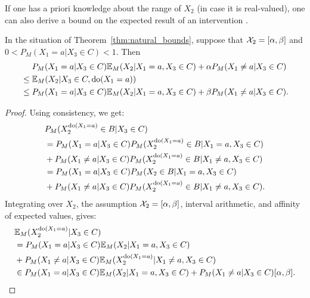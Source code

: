 If one has a priori knowledge about the range of $X_2$ (in case it is real-valued), one can also derive a bound on the expected result of an intervention \cite{ManskiPepper2013}.
\begin{Cor}\label{cor:natural_bounds}
  In the situation of Theorem~\ref{thm:natural_bounds}, suppose that $\mathcal{X}_2 = [\alpha,\beta]$ and $0 < P_M(X_1=a|X_3\in C) < 1$. Then
  \begin{equation}\label{eq:natural_bounds_CATE}\begin{split}
    & P_M(X_1=a|X_3\in C) \mathbb{E}_M(X_2|X_1=a,X_3\in C) + \alpha P_M(X_1\ne a|X_3\in C) \\
    {}\le {}& \mathbb{E}_M(X_2|X_3\in C,\operatorname{do}(X_1=a)) \\
    {}\le {}& P_M(X_1=a|X_3\in C) \mathbb{E}_M(X_2|X_1=a,X_3\in C) + \beta P_M(X_1\ne a|X_3\in C).
  \end{split}\end{equation}
\end{Cor}
\begin{proof}
Using consistency, we get:
\begin{equation*}\begin{split}
  &P_M(X_2^{\operatorname{do}(X_1=a)} \in B|X_3\in C) \\
  &= P_M(X_1=a|X_3\in C)  P_M(X_2^{\operatorname{do}(X_1=a)} \in B|X_1=a,X_3\in C)  \\
  & + P_M(X_1 \ne a|X_3\in C) P_M(X_2^{\operatorname{do}(X_1=a)} \in B|X_1\ne a,X_3\in C) \\
  &= P_M(X_1=a|X_3\in C)  P_M(X_2 \in B|X_1=a,X_3\in C)  \\
  & + P_M(X_1 \ne a|X_3\in C) P_M(X_2^{\operatorname{do}(X_1=a)} \in B|X_1\ne a,X_3\in C).
\end{split}\end{equation*}
Integrating over $X_2$, the assumption $\mathcal{X}_2 = [\alpha,\beta]$, interval arithmetic, and affinity of expected values, gives:
\begin{equation*}\begin{split}
  &\mathbb{E}_M(X_2^{\operatorname{do}(X_1=a)}|X_3\in C) \\
  &= P_M(X_1=a|X_3\in C) \mathbb{E}_M(X_2|X_1=a,X_3\in C)  \\
  &+ P_M(X_1 \ne a|X_3\in C) \mathbb{E}_M(X_2^{\operatorname{do}(X_1=a)}|X_1\ne a,X_3\in C) \\
  &\in P_M(X_1=a|X_3\in C) \mathbb{E}_M(X_2|X_1=a,X_3\in C) + P_M(X_1 \ne a|X_3\in C) [\alpha,\beta].
\end{split}\end{equation*}
\end{proof}
